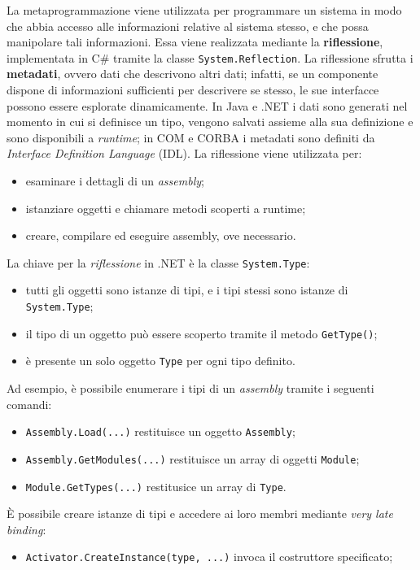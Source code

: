 \begin{solution}
La metaprogrammazione viene utilizzata per programmare  un sistema in modo che abbia accesso alle informazioni relative al sistema stesso, e che possa manipolare tali informazioni.
Essa viene realizzata mediante la \textbf{riflessione}, implementata in C\# tramite la classe \texttt{System.Reflection}.
La riflessione sfrutta i \textbf{metadati}, ovvero dati che descrivono altri dati; infatti, se un componente dispone di informazioni sufficienti per descrivere se stesso, le sue interfacce possono essere esplorate dinamicamente.
In Java e .NET i dati sono generati nel momento in cui si definisce un tipo, vengono salvati assieme alla sua definizione e sono disponibili a \textit{runtime}; in COM e CORBA i metadati sono definiti da \textit{Interface Definition Language} (IDL).
La riflessione viene utilizzata per:
\begin{itemize}
	\item esaminare i dettagli di un \textit{assembly};
	\item istanziare oggetti e chiamare metodi scoperti a runtime;
	\item creare, compilare ed eseguire assembly, ove necessario.
\end{itemize}
La chiave per la \textit{riflessione} in .NET è la classe \texttt{System.Type}:
\begin{itemize}
	\item tutti gli oggetti sono istanze di tipi, e i tipi stessi sono istanze di \texttt{System.Type};
	\item il tipo di un oggetto può essere scoperto tramite il metodo \texttt{GetType()};
	\item è presente un solo oggetto \texttt{Type} per ogni tipo definito.
\end{itemize}
Ad esempio, è possibile enumerare i tipi di un \textit{assembly} tramite i seguenti comandi:
\begin{itemize}
	\item \texttt{Assembly.Load(...)} restituisce un oggetto \texttt{Assembly};
	\item \texttt{Assembly.GetModules(...)} restituisce un array di oggetti \texttt{Module};
	\item \texttt{Module.GetTypes(...)} restitusice un array di \texttt{Type}.
\end{itemize}
È possibile creare istanze di tipi e accedere ai loro membri mediante \textit{very late binding}:
\begin{itemize}
	\item \texttt{Activator.CreateInstance(type, ...)} invoca il costruttore specificato;

\end{itemize}
\end{solution}
